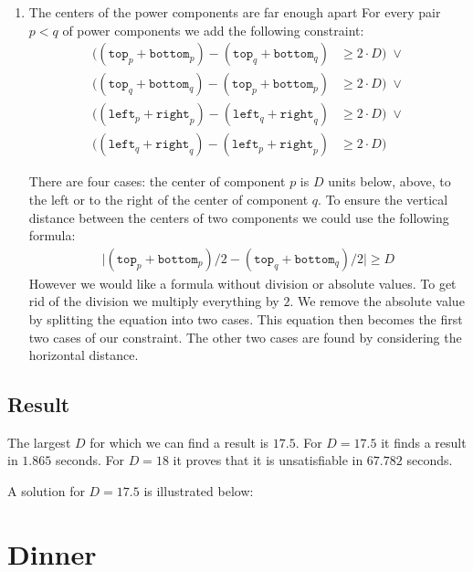 \documentclass{scrartcl}
\begin{document}
\begin{enumerate}
	\item The centers of the power components are far enough apart
	For every pair $p < q$ of power components we add the following constraint:
	\begin{align*}
		((\mathtt{top}_p + \mathtt{bottom}_p) - (\mathtt{top}_q + \mathtt{bottom}_q) &\geq 2\cdot D)\;\lor\\
		((\mathtt{top}_q + \mathtt{bottom}_q) - (\mathtt{top}_p + \mathtt{bottom}_p) &\geq 2\cdot D)\;\lor\\
		((\mathtt{left}_p + \mathtt{right}_p) - (\mathtt{left}_q + \mathtt{right}_q) &\geq 2\cdot D)\;\lor\\
		((\mathtt{left}_q + \mathtt{right}_q) - (\mathtt{left}_p + \mathtt{right}_p) &\geq 2\cdot D)
	\end{align*}

	There are four cases: the center of component $p$ is $D$ units below, above, to the left or to the right of the center of component $q$. To ensure the vertical distance between the centers of two components we could use the following formula:
	\begin{align*}
		\lvert(\mathtt{top}_p + \mathtt{bottom}_p)/2 - (\mathtt{top}_q + \mathtt{bottom}_q)/2\rvert \geq D
	\end{align*}
	However we would like a formula without division or absolute values.
	To get rid of the division we multiply everything by $2$.
	We remove the absolute value by splitting the equation into two cases.
	This equation then becomes the first two cases of our constraint.
	The other two cases are found by considering the horizontal distance.
\end{enumerate}

\subsection{Result} %
\label{sub:result}
The largest $D$ for which we can find a result is $17.5$.
For $D=17.5$ it finds a result in $1.865$ seconds.
For $D=18$ it proves that it is unsatisfiable in $67.782$ seconds.

A solution for $D=17.5$ is illustrated below:
\begin{figure}[H]
	\centering
	
\end{figure}


\section{Dinner}
\end{document}
